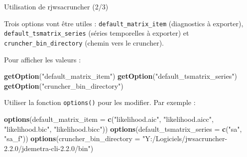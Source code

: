 \documentclass[10pt,xcolor=table,color={dvipsnames,usenames},ignorenonframetext,usepdftitle=false,french]{beamer}
\newenvironment{Shaded}{\begin{snugshade}}{\end{snugshade}}
\newcommand{\DataTypeTok}[1]{\textcolor[rgb]{0.13,0.29,0.53}{#1}}
\newcommand{\KeywordTok}[1]{\textcolor[rgb]{0.13,0.29,0.53}{\textbf{#1}}}
\newcommand{\NormalTok}[1]{#1}
\newcommand{\StringTok}[1]{\textcolor[rgb]{0.31,0.60,0.02}{#1}}
\begin{document}
\begin{frame}[fragile]{Utilisation de rjwsacruncher (2/3)}
\protect\hypertarget{utilisation-de-rjwsacruncher-23}{}

Trois options vont être utiles : \texttt{default\_matrix\_item}
(diagnostics à exporter), \texttt{default\_tsmatrix\_series} (séries
temporelles à exporter) et \texttt{cruncher\_bin\_directory} (chemin
vers le cruncher).

Pour afficher les valeurs :

\begin{Shaded}
\begin{Highlighting}[]
\KeywordTok{getOption}\NormalTok{(}\StringTok{"default_matrix_item"}\NormalTok{)}
\KeywordTok{getOption}\NormalTok{(}\StringTok{"default_tsmatrix_series"}\NormalTok{)}
\KeywordTok{getOption}\NormalTok{(}\StringTok{"cruncher_bin_directory"}\NormalTok{)}
\end{Highlighting}
\end{Shaded}

Utiliser la fonction \texttt{options()} pour les modifier. Par exemple :

\begin{Shaded}
\begin{Highlighting}[]
\KeywordTok{options}\NormalTok{(}\DataTypeTok{default_matrix_item =} \KeywordTok{c}\NormalTok{(}\StringTok{"likelihood.aic"}\NormalTok{,}
                                \StringTok{"likelihood.aicc"}\NormalTok{,}
                                \StringTok{"likelihood.bic"}\NormalTok{,}
                                \StringTok{"likelihood.bicc"}\NormalTok{))}
\KeywordTok{options}\NormalTok{(}\DataTypeTok{default_tsmatrix_series =} \KeywordTok{c}\NormalTok{(}\StringTok{"sa"}\NormalTok{, }\StringTok{"sa_f"}\NormalTok{))}
\KeywordTok{options}\NormalTok{(}\DataTypeTok{cruncher_bin_directory =}
            \StringTok{"Y:/Logiciels/jwsacruncher-2.2.0/jdemetra-cli-2.2.0/bin"}\NormalTok{)}
\end{Highlighting}
\end{Shaded}

\end{frame}
\end{document}
